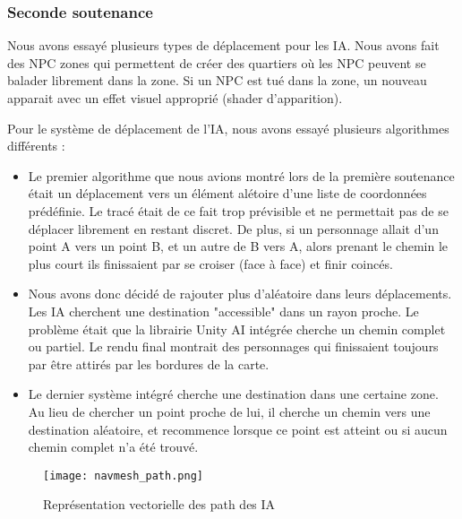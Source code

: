     \subsubsection{Seconde soutenance}


        Nous avons essayé plusieurs types de déplacement pour les IA. Nous avons fait des NPC zones qui permettent de créer des quartiers
        où les NPC peuvent se balader librement dans la zone. Si un NPC est tué dans la zone, un nouveau apparait avec un effet visuel 
        approprié (shader d'apparition).
        

        Pour le système de déplacement de l'IA,
        nous avons essayé plusieurs algorithmes différents :
        
        \begin{itemize}
            \item Le premier algorithme que nous avions montré lors de la première soutenance
            était un déplacement vers un élément alétoire d'une liste de coordonnées prédéfinie.
            Le tracé était de ce fait trop prévisible et ne permettait pas de se déplacer librement en restant discret.
            De plus, si un personnage allait d'un point A vers un point B, et un autre de B vers A,
            alors prenant le chemin le plus court ils finissaient par se croiser (face à face) et finir coincés.
            
            \item Nous avons donc décidé de rajouter plus d'aléatoire dans leurs déplacements. Les IA cherchent une 
            destination "accessible" dans un rayon proche. Le problème était que la librairie Unity AI intégrée 
            cherche un chemin complet ou partiel. Le rendu final montrait des personnages qui finissaient toujours 
            par être attirés par les bordures de la carte.

            \item  Le dernier système intégré cherche une destination dans une certaine zone.
            Au lieu de chercher un point proche de lui, il cherche un chemin vers une destination aléatoire, 
            et recommence lorsque ce point est atteint ou si aucun chemin complet n'a été trouvé.
        \end{itemize}
            

        \begin{figure}[hbt!]
            \centering
            \texttt{[image: navmesh\_path.png]}
            \caption{Représentation vectorielle des path des IA}
        \end{figure}
        
